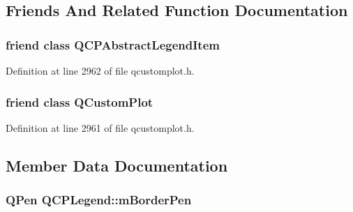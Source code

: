 \subsection{Friends And Related Function Documentation}
\hypertarget{class_q_c_p_legend_a8a375e31e42c68de049fcf0fd35db5b0}{
\subsubsection[{Q\-C\-P\-Abstract\-Legend\-Item}]{\setlength{\rightskip}{0pt plus 5cm}friend class {\bf Q\-C\-P\-Abstract\-Legend\-Item}\hspace{0.3cm}{\ttfamily [friend]}}}\label{class_q_c_p_legend_a8a375e31e42c68de049fcf0fd35db5b0}


Definition at line 2962 of file qcustomplot.\-h.

\hypertarget{class_q_c_p_legend_a1cdf9df76adcfae45261690aa0ca2198}{
\subsubsection[{Q\-Custom\-Plot}]{\setlength{\rightskip}{0pt plus 5cm}friend class {\bf Q\-Custom\-Plot}\hspace{0.3cm}{\ttfamily [friend]}}}\label{class_q_c_p_legend_a1cdf9df76adcfae45261690aa0ca2198}


Definition at line 2961 of file qcustomplot.\-h.



\subsection{Member Data Documentation}
\hypertarget{class_q_c_p_legend_a52ab8342a382456131d567f962d7f9d0}{
\subsubsection[{m\-Border\-Pen}]{\setlength{\rightskip}{0pt plus 5cm}Q\-Pen Q\-C\-P\-Legend\-::m\-Border\-Pen\hspace{0.3cm}{\ttfamily [protected]}}}\label{class_q_c_p_legend_a52ab8342a382456131d567f962d7f9d0}



